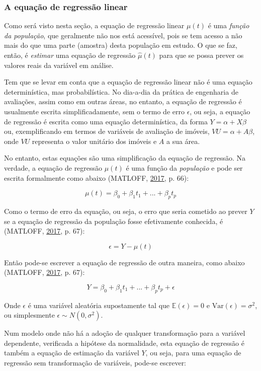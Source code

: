 \documentclass[a4paper, 12pt]{article}
\begin{document}
\subsubsection{A equação de regressão
linear}\label{a-equacao-de-regressao-linear}

Como será visto nesta seção, a equação de regressão linear \(\mu(t)\) é
uma \emph{função da população}, que geralmente não nos está acessível,
pois se tem acesso a não mais do que uma parte (amostra) desta população
em estudo. O que se faz, então, é \emph{estimar} uma equação de
regressão \(\hat{\mu}(t)\) para que se possa prever os valores reais da
variável em análise.

Tem que se levar em conta que a equação de regressão linear não é uma
equação determinística, mas probabilística. No dia-a-dia da prática de
engenharia de avaliações, assim como em outras áreas, no entanto, a
equação de regressão é usualmente escrita simplificadamente, sem o termo
de erro \(\epsilon\), ou seja, a equação de regressão é escrita como uma
equação determinística, da forma \(Y = \alpha + X\beta\) ou,
exemplificando em termos de variáveis de avaliação de imóveis,
\(VU = \alpha + A\beta\), onde \(VU\) representa o valor unitário dos
imóveis e \(A\) a sua área.

No entanto, estas equações são uma simplificação da equação de
regressão. Na verdade, a equação de regressão \(\mu(t)\) é uma função da
\emph{população} e pode ser escrita formalmente como abaixo (MATLOFF,
\protect\hyperlink{ref-matloff2017}{2017}, p. 66):

\[\mu(t) = \beta_0 + \beta_1t_1 + ... + \beta_p t_p\]

Como o termo de erro da equação, ou seja, o erro que seria cometido ao
prever \(Y\) se a equação de regressão da população fosse efetivamente
conhecida, é (MATLOFF, \protect\hyperlink{ref-matloff2017}{2017}, p.
67):

\[\epsilon = Y - \mu(t)\]

Então pode-se escrever a equação de regressão de outra maneira, como
abaixo (MATLOFF, \protect\hyperlink{ref-matloff2017}{2017}, p. 67):

\[Y = \beta_0 + \beta_1t_1 + ... + \beta_p t_p + \epsilon\]

Onde \(\epsilon\) é uma variável aleatória supostamente tal que
\(\mathbb{E}(\epsilon) = 0\) e \(\text{Var}(\epsilon) = \sigma^2\), ou
simplesmente \(\epsilon \sim N(0, \sigma^2)\).

Num modelo onde não há a adoção de qualquer transformação para a
variável dependente, verificada a hipótese da normalidade, esta equação
de regressão é também a equação de estimação da variável \(Y\), ou seja,
para uma equação de regressão sem transformação de variáveis, pode-se
escrever:
\end{document}
